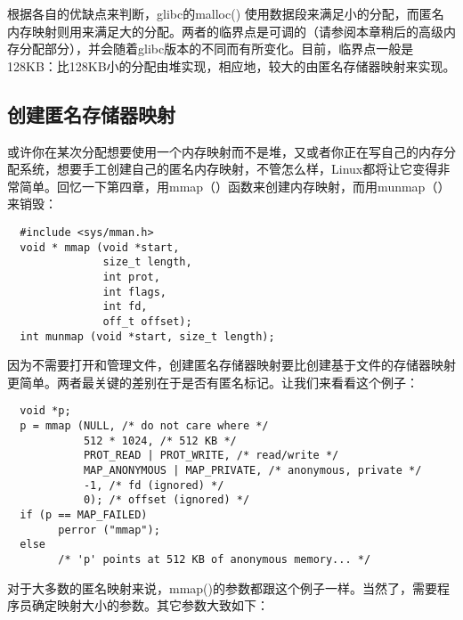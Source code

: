 根据各自的优缺点来判断，glibc的malloc() 使用数据段来满足小的分配，而匿名内存映射则用来满足大的分配。两者的临界点是可调的（请参阅本章稍后的高级内存分配部分），并会随着glibc版本的不同而有所变化。目前，临界点一般是128KB：比128KB小的分配由堆实现，相应地，较大的由匿名存储器映射来实现。 

\subsection{创建匿名存储器映射}

或许你在某次分配想要使用一个内存映射而不是堆，又或者你正在写自己的内存分配系统，想要手工创建自己的匿名内存映射，不管怎么样，Linux都将让它变得非常简单。回忆一下第四章，用mmap（）函数来创建内存映射，而用munmap（）来销毁： 

\begin{lstlisting}
  #include <sys/mman.h>
  void * mmap (void *start,
               size_t length,
               int prot,
               int flags,
               int fd,
               off_t offset);
  int munmap (void *start, size_t length);
\end{lstlisting}

因为不需要打开和管理文件，创建匿名存储器映射要比创建基于文件的存储器映射更简单。两者最关键的差别在于是否有匿名标记。让我们来看看这个例子： 

\begin{lstlisting}
  void *p;
  p = mmap (NULL, /* do not care where */
            512 * 1024, /* 512 KB */
            PROT_READ | PROT_WRITE, /* read/write */
            MAP_ANONYMOUS | MAP_PRIVATE, /* anonymous, private */
            -1, /* fd (ignored) */
            0); /* offset (ignored) */
  if (p == MAP_FAILED)
        perror ("mmap");
  else
        /* 'p' points at 512 KB of anonymous memory... */
\end{lstlisting}

对于大多数的匿名映射来说，mmap()的参数都跟这个例子一样。当然了，需要程序员确定映射大小的参数。其它参数大致如下： 

